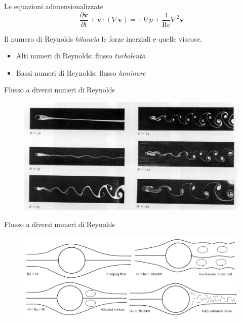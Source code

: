 \documentclass[11pt]{beamer}
\begin{document}
\begin{frame}{Le equazioni adimensionalizzate}
\begin{equation}
\frac{\partial \mathbf{v}}{\partial t} +\mathbf{v} \cdot (\nabla \mathbf{v}) = -\nabla p + \frac{1}{\text{Re}} \nabla^2 \mathbf{v}
\end{equation}

Il numero di Reynolds \emph{bilancia} le forze inerziali e quelle viscose.

\begin{itemize}
\item Alti numeri di Reynolds: flusso \emph{turbolento}
\item Bassi numeri di Reynolds: flusso \emph{laminare}
\end{itemize}
\end{frame}

\begin{frame}{Flusso a diversi numeri di Reynolds}
\begin{figure}
\centering
\includegraphics[scale=2.7]{allees.jpg}
\end{figure}
\end{frame}

\begin{frame}{Flusso a diversi numeri di Reynolds}
\begin{figure}
\centering
\includegraphics[scale=0.4]{flow_cylinder_6.png}
\end{figure}
\end{frame}
\end{document}
